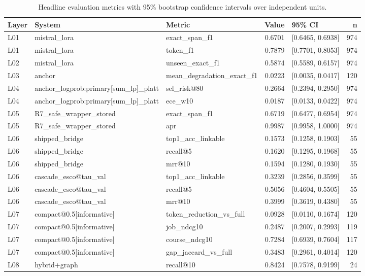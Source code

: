 \begin{table}[H]
\centering
\small
\caption{Headline evaluation metrics with 95\% bootstrap confidence intervals over independent units.}
\label{tab:evaluation-headline}
\begin{tabular}{lllrlr}
\toprule
Layer & System & Metric & Value & 95\% CI & n \\
\midrule
L01 & mistral\_lora & exact\_span\_f1 & 0.6701 & [0.6465, 0.6938] & 974 \\
L01 & mistral\_lora & token\_f1 & 0.7879 & [0.7701, 0.8053] & 974 \\
L02 & mistral\_lora & unseen\_exact\_f1 & 0.5874 & [0.5589, 0.6157] & 974 \\
L03 & anchor & mean\_degradation\_exact\_f1 & 0.0223 & [0.0035, 0.0417] & 120 \\
L04 & anchor\_logprob:primary[sum\_lp]\_platt & sel\_risk@80 & 0.2664 & [0.2394, 0.2950] & 974 \\
L04 & anchor\_logprob:primary[sum\_lp]\_platt & ece\_w10 & 0.0187 & [0.0133, 0.0422] & 974 \\
L05 & R7\_safe\_wrapper\_stored & exact\_span\_f1 & 0.6719 & [0.6477, 0.6954] & 974 \\
L05 & R7\_safe\_wrapper\_stored & apr & 0.9987 & [0.9958, 1.0000] & 974 \\
L06 & shipped\_bridge & top1\_acc\_linkable & 0.1573 & [0.1258, 0.1903] & 55 \\
L06 & shipped\_bridge & recall@5 & 0.1620 & [0.1295, 0.1968] & 55 \\
L06 & shipped\_bridge & mrr@10 & 0.1594 & [0.1280, 0.1930] & 55 \\
L06 & cascade\_esco@tau\_val & top1\_acc\_linkable & 0.3239 & [0.2856, 0.3599] & 55 \\
L06 & cascade\_esco@tau\_val & recall@5 & 0.5056 & [0.4604, 0.5505] & 55 \\
L06 & cascade\_esco@tau\_val & mrr@10 & 0.3999 & [0.3619, 0.4380] & 55 \\
L07 & compact@0.5[informative] & token\_reduction\_vs\_full & 0.0928 & [0.0110, 0.1674] & 120 \\
L07 & compact@0.5[informative] & job\_ndcg10 & 0.2487 & [0.2007, 0.2993] & 119 \\
L07 & compact@0.5[informative] & course\_ndcg10 & 0.7284 & [0.6939, 0.7604] & 117 \\
L07 & compact@0.5[informative] & gap\_jaccard\_vs\_full & 0.3483 & [0.2961, 0.4014] & 120 \\
L08 & hybrid+graph & recall@10 & 0.8424 & [0.7578, 0.9199] & 24 \\

\end{tabular}
\end{table}
